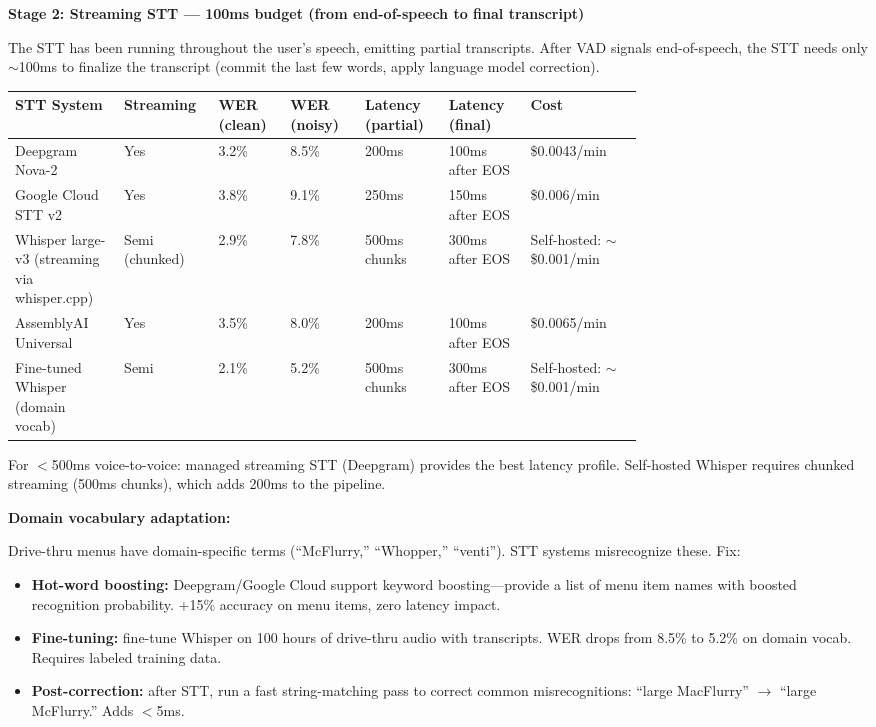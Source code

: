 \textbf{Stage 2: Streaming STT --- 100ms budget (from end-of-speech to final transcript)}

The STT has been running throughout the user's speech, emitting partial transcripts. After VAD signals end-of-speech, the STT needs only $\sim$100ms to finalize the transcript (commit the last few words, apply language model correction).

{\small
\begin{tabular}{|p{0.14\linewidth}|p{0.07\linewidth}|p{0.08\linewidth}|p{0.1\linewidth}|p{0.09\linewidth}|p{0.1\linewidth}|p{0.15\linewidth}|}
\hline
\textbf{STT System} & \textbf{Streaming} & \textbf{WER (clean)} & \textbf{WER (noisy)} & \textbf{Latency (partial)} & \textbf{Latency (final)} & \textbf{Cost} \\
\hline
Deepgram Nova-2 & Yes & 3.2\% & 8.5\% & 200ms & 100ms after EOS & \$0.0043/min \\
\hline
Google Cloud STT v2 & Yes & 3.8\% & 9.1\% & 250ms & 150ms after EOS & \$0.006/min \\
\hline
Whisper large-v3 (streaming via whisper.cpp) & Semi (chunked) & 2.9\% & 7.8\% & 500ms chunks & 300ms after EOS & Self-hosted: $\sim$\$0.001/min \\
\hline
AssemblyAI Universal & Yes & 3.5\% & 8.0\% & 200ms & 100ms after EOS & \$0.0065/min \\
\hline
Fine-tuned Whisper (domain vocab) & Semi & 2.1\% & 5.2\% & 500ms chunks & 300ms after EOS & Self-hosted: $\sim$\$0.001/min \\
\hline
\end{tabular}
}

\bigskip
For $<$500ms voice-to-voice: managed streaming STT (Deepgram) provides the best latency profile. Self-hosted Whisper requires chunked streaming (500ms chunks), which adds 200ms to the pipeline.

\textbf{Domain vocabulary adaptation:}

Drive-thru menus have domain-specific terms (``McFlurry,'' ``Whopper,'' ``venti''). STT systems misrecognize these. Fix:
\begin{itemize}
  \item \textbf{Hot-word boosting:} Deepgram/Google Cloud support keyword boosting---provide a list of menu item names with boosted recognition probability. +15\% accuracy on menu items, zero latency impact.
  \item \textbf{Fine-tuning:} fine-tune Whisper on 100 hours of drive-thru audio with transcripts. WER drops from 8.5\% to 5.2\% on domain vocab. Requires labeled training data.
  \item \textbf{Post-correction:} after STT, run a fast string-matching pass to correct common misrecognitions: ``large MacFlurry'' $\rightarrow$ ``large McFlurry.'' Adds $<$5ms.
\end{itemize}


